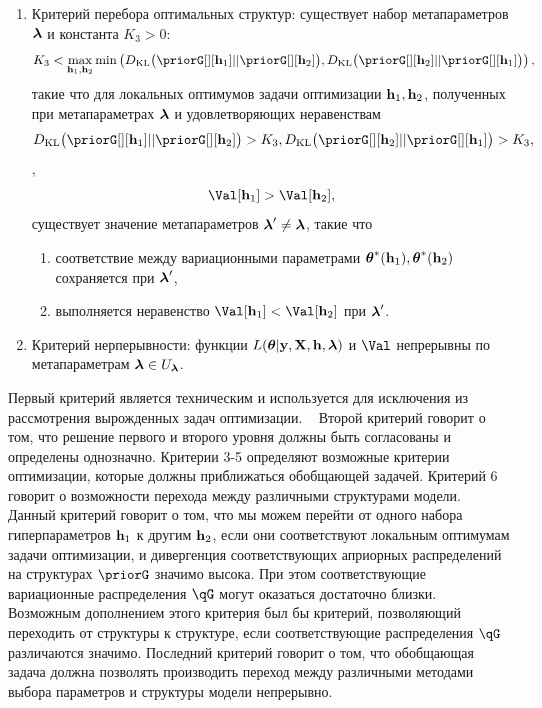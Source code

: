 \begin{defin}
\begin{enumerate}
\item Критерий перебора оптимальных структур: существует набор метапараметров $\boldsymbol{\lambda}$ и константа $K_3>0:$  $$K_3 < \max_{\mathbf{h}_1, \mathbf{h}_2} \min\left(\KL{\priorG[][\h_1]}{\priorG[][\h_2]},\KL{\priorG[][\h_2]}{\priorG[][\h_1]}\right),$$ такие что для локальных оптимумов задачи оптимизации $\mathbf{h}_1,\mathbf{h}_2$, полученных при метапараметрах $\boldsymbol{\lambda}$ и удовлетворяющих неравенствам $$\KL{\priorG[][\h_1]}{\priorG[][\h_2]} > K_3, \KL{\priorG[][\h_2]}{\priorG[][\h_1]}>K_3,$$,$$\Val[\h_1] > \Val[\h_2],$$  существует значение метапараметров $\boldsymbol{\lambda}' \neq \boldsymbol{\lambda}$, такие что
\begin{enumerate}
\item соответствие между вариационными параметрами $\boldsymbol{\theta}^{*}(\mathbf{h}_1),\boldsymbol{\theta}^{*}(\mathbf{h}_2)$ сохраняется при  $\boldsymbol{\lambda}'$,
\item выполняется неравенство $\Val[\h_1] < \Val[\h_2]$ при $\boldsymbol{\lambda}'$.
\end{enumerate}


\item Критерий нерперывности: функции $L(\boldsymbol{\theta} |\mathbf{y},\mathbf{X},\mathbf{h},\boldsymbol{\lambda})$ и $\Val$ непрерывны по метапараметрам $\boldsymbol{\lambda} \in U_{\boldsymbol{\lambda}}$.
\end{enumerate}
\end{defin}
Первый критерий является техническим и используется для исключения из рассмотрения вырожденных задач оптимизации.  
Второй критерий говорит о том, что решение первого и второго уровня должны быть согласованы и определены однозначно.
Критерии 3-5 определяют возможные критерии оптимизации, которые должны приближаться обобщающей задачей.
Критерий 6 говорит о возможности перехода между различными структурами модели. Данный критерий говорит о том, что мы можем перейти от одного набора гиперпараметров $\mathbf{h}_1$ к другим $\mathbf{h}_2$, если они соответствуют локальным оптимумам задачи оптимизации, и дивергенция соответствующих априорных  распределений на структурах $\priorG$ значимо высока. При этом соответствующие вариационные распределения $\qG$ могут оказаться достаточно близки. Возможным дополнением этого критерия был бы критерий, позволяющий переходить от структуры к структуре, если соответствующие распределения $\qG$ различаются значимо.
Последний критерий говорит о том, что обобщающая задача должна позволять производить переход между различными методами выбора  параметров и структуры модели непрерывно.

